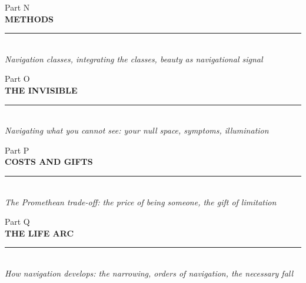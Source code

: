 \documentclass[11pt,letterpaper,openany]{book}
\begin{document}


\clearpage
\thispagestyle{empty}
\vspace*{5cm}
\begin{center}
{\large\sffamily\color{partgray}Part N}\\[0.5cm]
{\Huge\sffamily\bfseries\color{headerblue} METHODS}\\[0.5cm]
{\color{rulegray}\rule{5cm}{0.3pt}}\\[1cm]
{\normalsize\itshape\color{partgray}Navigation classes, integrating the classes, beauty as navigational signal}
\end{center}
\clearpage
{}



\clearpage
\thispagestyle{empty}
\vspace*{5cm}
\begin{center}
{\large\sffamily\color{partgray}Part O}\\[0.5cm]
{\Huge\sffamily\bfseries\color{headerblue} THE INVISIBLE}\\[0.5cm]
{\color{rulegray}\rule{5cm}{0.3pt}}\\[1cm]
{\normalsize\itshape\color{partgray}Navigating what you cannot see: your null space, symptoms, illumination}
\end{center}
\clearpage
{}



\clearpage
\thispagestyle{empty}
\vspace*{5cm}
\begin{center}
{\large\sffamily\color{partgray}Part P}\\[0.5cm]
{\Huge\sffamily\bfseries\color{headerblue} COSTS AND GIFTS}\\[0.5cm]
{\color{rulegray}\rule{5cm}{0.3pt}}\\[1cm]
{\normalsize\itshape\color{partgray}The Promethean trade-off: the price of being someone, the gift of limitation}
\end{center}
\clearpage
{}



\clearpage
\thispagestyle{empty}
\vspace*{5cm}
\begin{center}
{\large\sffamily\color{partgray}Part Q}\\[0.5cm]
{\Huge\sffamily\bfseries\color{headerblue} THE LIFE ARC}\\[0.5cm]
{\color{rulegray}\rule{5cm}{0.3pt}}\\[1cm]
{\normalsize\itshape\color{partgray}How navigation develops: the narrowing, orders of navigation, the necessary fall}
\end{center}
\clearpage
{}
\end{document}
